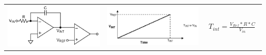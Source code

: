 \begin{tabular}{ccp{4cm}}
\includegraphics[width=6cm, valign=t]{pictures/singleSlope1}
&
\includegraphics[width=6cm, valign=t]{pictures/singleSlope2}
&
  {\begin{align*}
    T_{int}=\frac{V_{Ref}*R*C}{V_{in}}
  \end{align*}}
\\ 
\end{tabular}


